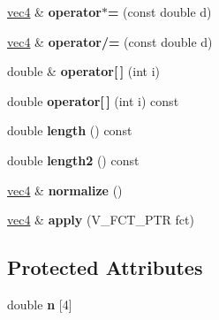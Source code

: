 \begin{DoxyCompactItemize}
\item 
\hypertarget{classvec4_a093ca4e561679c66f329ab2778e49dad}{
\hyperlink{classvec4}{vec4} \& {\bfseries operator$\ast$=} (const double d)}
\label{classvec4_a093ca4e561679c66f329ab2778e49dad}

\item 
\hypertarget{classvec4_a11860dc307886911362488642c28d157}{
\hyperlink{classvec4}{vec4} \& {\bfseries operator/=} (const double d)}
\label{classvec4_a11860dc307886911362488642c28d157}

\item 
\hypertarget{classvec4_afc5b954c340a9f40be2f181dcc7f07cc}{
double \& {\bfseries operator\mbox{[}$\,$\mbox{]}} (int i)}
\label{classvec4_afc5b954c340a9f40be2f181dcc7f07cc}

\item 
\hypertarget{classvec4_aa281995f642cb1e8032ffe2f284d4e4d}{
double {\bfseries operator\mbox{[}$\,$\mbox{]}} (int i) const }
\label{classvec4_aa281995f642cb1e8032ffe2f284d4e4d}

\item 
\hypertarget{classvec4_aac107787321d90beb2e02a6e8cf4f6da}{
double {\bfseries length} () const }
\label{classvec4_aac107787321d90beb2e02a6e8cf4f6da}

\item 
\hypertarget{classvec4_ab3b0f038a017fdeed0f8028894aa026a}{
double {\bfseries length2} () const }
\label{classvec4_ab3b0f038a017fdeed0f8028894aa026a}

\item 
\hypertarget{classvec4_a13ccaff64d17779921fabd9d65396a4b}{
\hyperlink{classvec4}{vec4} \& {\bfseries normalize} ()}
\label{classvec4_a13ccaff64d17779921fabd9d65396a4b}

\item 
\hypertarget{classvec4_ae4787582447129f06bded51177bc07a6}{
\hyperlink{classvec4}{vec4} \& {\bfseries apply} (V\_\-FCT\_\-PTR fct)}
\label{classvec4_ae4787582447129f06bded51177bc07a6}

\end{DoxyCompactItemize}
\subsection*{Protected Attributes}
\begin{DoxyCompactItemize}
\item 
\hypertarget{classvec4_af6a31658cfff7b70aec930c3bb8fb868}{
double {\bfseries n} \mbox{[}4\mbox{]}}
\label{classvec4_af6a31658cfff7b70aec930c3bb8fb868}

\end{DoxyCompactItemize}
